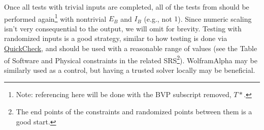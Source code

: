 \documentclass[12pt, titlepage]{article}
\begin{document}
Once all tests with trivial inputs are completed, all of the tests from
 should be performed again\footnote{Note:
referencing here will be done with the BVP subscript removed, $T*$.} with
nontrivial $E_B$ and $I_B$ (e.g., not $1$). Since numeric scaling isn't very
consequential to the output, we will omit for brevity. Testing with randomized
inputs is a good strategy, similar to how testing is done via
\href{https://hackage.haskell.org/package/QuickCheck}{QuickCheck}, and should be
used with a reasonable range of values (see the Table of Software and Physical
constraints in the related SRS\footnote{The end points of the constraints and
randomized points between them is a good start.}). WolframAlpha may be similarly
used as a control, but having a trusted solver locally may be beneficial.
\end{document}
